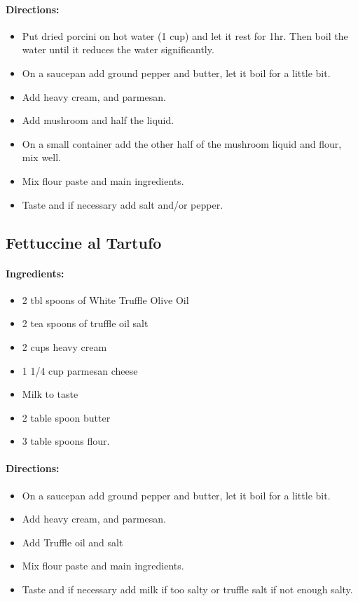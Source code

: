 \documentclass{article}
\begin{document}
\paragraph{Directions:}
\begin{itemize}
    \item Put dried porcini on hot water (1 cup) and let it rest for 1hr. Then boil the water until it reduces the water significantly.
    \item On a saucepan add ground pepper and butter, let it boil for a little bit.
    \item Add heavy cream, and parmesan.
    \item Add mushroom and half the liquid.
    \item On a small container add the other half of the mushroom liquid and flour, mix well.
    \item Mix flour paste and main ingredients.
    \item Taste and if necessary add salt and/or pepper.
\end{itemize}

\subsection{Fettuccine al Tartufo}

\paragraph{Ingredients:}
\begin{itemize}
    \item 2 tbl spoons of White Truffle Olive Oil
    \item 2 tea spoons of truffle oil salt
    \item 2 cups heavy cream
    \item 1 1/4 cup parmesan cheese
    \item Milk to taste
    \item 2 table spoon butter
    \item 3 table spoons flour.
\end{itemize}

\paragraph{Directions:}
\begin{itemize}
    \item On a saucepan add ground pepper and butter, let it boil for a little bit.
    \item Add heavy cream, and parmesan.
    \item Add Truffle oil and salt
    \item Mix flour paste and main ingredients.
    \item Taste and if necessary add milk if too salty or truffle salt if not enough salty.
\end{itemize}
\end{document}
